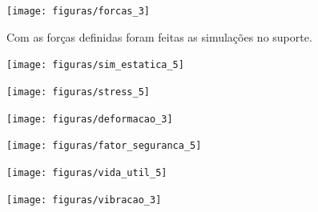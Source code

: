     \begin{center}
        \texttt{[image: figuras/forcas\_3]}
        \label{forcas_3}
    \end{center}
    
Com as forças definidas foram feitas as simulações no suporte.
    \begin{center}
        \texttt{[image: figuras/sim\_estatica\_5]}
        \label{sim_estatica_5}
    \end{center} 
    
     \begin{center}
        \texttt{[image: figuras/stress\_5]}
        \label{stress_5}
    \end{center} 
    
    \begin{center}
        \texttt{[image: figuras/deformacao\_3]}
        \label{deformacao_3}
    \end{center} 
    
     \begin{center}
        \texttt{[image: figuras/fator\_seguranca\_5]}
        \label{fator_seguranca_5}
    \end{center} 
    
    \begin{center}
        \texttt{[image: figuras/vida\_util\_5]}
        \label{vida_util_5}
    \end{center} 
    
    \begin{center}
        \texttt{[image: figuras/vibracao\_3]}
        \label{vibracao_3}
    \end{center} 
 
